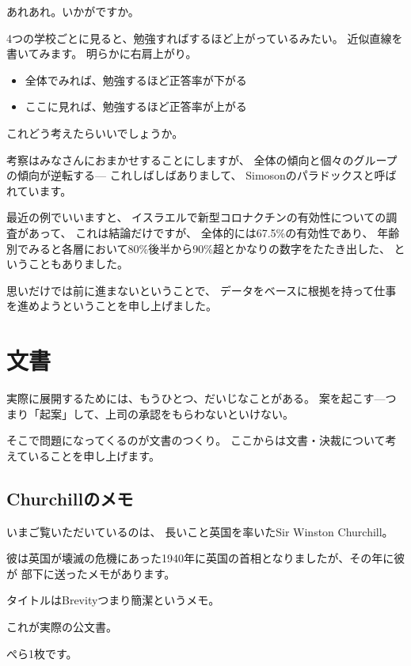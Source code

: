 \documentclass[uplatex,jis2004,dvipdfmx,12pt]{jsarticle}
\begin{document}
あれあれ。いかがですか。

4つの学校ごとに見ると、勉強すればするほど上がっているみたい。
近似直線を書いてみます。
明らかに右肩上がり。


\begin{itemize}
 \item 全体でみれば、勉強するほど正答率が下がる
 \item ここに見れば、勉強するほど正答率が上がる
\end{itemize}
これどう考えたらいいでしょうか。


考察はみなさんにおまかせすることにしますが、
全体の傾向と個々のグループの傾向が逆転する---
これしばしばありまして、
Simosonのパラドックスと呼ばれています。



最近の例でいいますと、
イスラエルで新型コロナクチンの有効性についての調査があって、
これは結論だけですが、
全体的には67.5\%の有効性であり、
年齢別でみると各層において80\%後半から90\%超とかなりの数字をたたき出した、
ということもありました。

思いだけでは前に進まないということで、
データをベースに根拠を持って仕事を進めようということを申し上げました。
\newpage

\section{文書}


実際に展開するためには、もうひとつ、だいじなことがある。
案を起こす---つまり「起案」して、上司の承認をもらわないといけない。

そこで問題になってくるのが文書のつくり。
ここからは文書・決裁について考えていることを申し上げます。

\subsection{Churchillのメモ}

いまご覧いただいているのは、
長いこと英国を率いたSir Winston Churchill。

彼は英国が壊滅の危機にあった1940年に英国の首相となりましたが、その年に彼
が
部下に送ったメモがあります。

タイトルはBrevityつまり簡潔というメモ。

これが実際の公文書。

ぺら1枚です。
\end{document}
